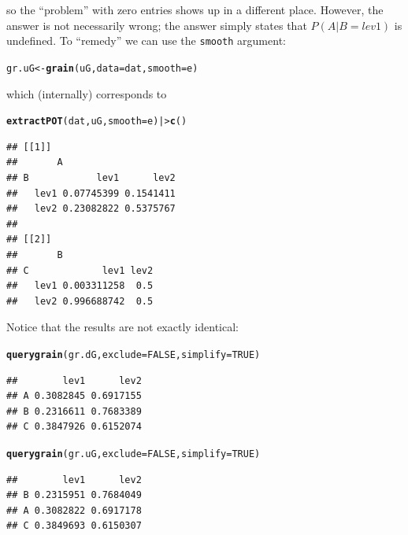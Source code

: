 \documentclass[10pt]{article}\usepackage[]{graphicx}\usepackage[]{xcolor}
\makeatletter
\newcommand{\hlnum}[1]{\textcolor[rgb]{0.686,0.059,0.569}{#1}}%
\newcommand{\hlstd}[1]{\textcolor[rgb]{0.345,0.345,0.345}{#1}}%
\newcommand{\hlkwb}[1]{\textcolor[rgb]{0.69,0.353,0.396}{#1}}%
\newcommand{\hlkwc}[1]{\textcolor[rgb]{0.333,0.667,0.333}{#1}}%
\newcommand{\hlkwd}[1]{\textcolor[rgb]{0.737,0.353,0.396}{\textbf{#1}}}%
\newenvironment{kframe}{%
 \def\at@end@of@kframe{}%
 \ifinner\ifhmode%
  \def\at@end@of@kframe{\end{minipage}}%
  \begin{minipage}{\columnwidth}%
 \fi\fi%
 \def\FrameCommand##1{\hskip\@totalleftmargin \hskip-\fboxsep
 \colorbox{shadecolor}{##1}\hskip-\fboxsep
     \hskip-\linewidth \hskip-\@totalleftmargin \hskip\columnwidth}%
 \MakeFramed {\advance\hsize-\width
   \@totalleftmargin\z@ \linewidth\hsize
   \@setminipage}}%
 {\par\unskip\endMakeFramed%
 \at@end@of@kframe}
\newenvironment{knitrout}{}{} %
\def\code#1{{\texttt{#1}}}
\makeatother
\begin{document}
so the ``problem'' with zero entries shows up in a different
place. However, the answer is not necessarily wrong; the answer simply
states that $P(A|B=lev1)$ is undefined.
To ``remedy'' we can use the \code{smooth} argument:
\begin{knitrout}
\color{fgcolor}\begin{kframe}
\begin{alltt}
\hlstd{gr.uG} \hlkwb{<-} \hlkwd{grain}\hlstd{(uG,} \hlkwc{data}\hlstd{=dat,} \hlkwc{smooth}\hlstd{=e)}
\end{alltt}
\end{kframe}
\end{knitrout}
which (internally) corresponds to
\begin{knitrout}
\color{fgcolor}\begin{kframe}
\begin{alltt}
\hlkwd{extractPOT}\hlstd{(dat, uG,} \hlkwc{smooth}\hlstd{=e) |>} \hlkwd{c}\hlstd{()}
\end{alltt}
\begin{verbatim}
## [[1]]
##       A
## B            lev1      lev2
##   lev1 0.07745399 0.1541411
##   lev2 0.23082822 0.5375767
## 
## [[2]]
##       B
## C             lev1 lev2
##   lev1 0.003311258  0.5
##   lev2 0.996688742  0.5
\end{verbatim}
\end{kframe}
\end{knitrout}

Notice that the results are not exactly identical:

\begin{knitrout}
\color{fgcolor}\begin{kframe}
\begin{alltt}
\hlkwd{querygrain}\hlstd{(gr.dG,} \hlkwc{exclude}\hlstd{=}\hlnum{FALSE}\hlstd{,} \hlkwc{simplify}\hlstd{=}\hlnum{TRUE}\hlstd{)}
\end{alltt}
\begin{verbatim}
##        lev1      lev2
## A 0.3082845 0.6917155
## B 0.2316611 0.7683389
## C 0.3847926 0.6152074
\end{verbatim}
\begin{alltt}
\hlkwd{querygrain}\hlstd{(gr.uG,} \hlkwc{exclude}\hlstd{=}\hlnum{FALSE}\hlstd{,} \hlkwc{simplify}\hlstd{=}\hlnum{TRUE}\hlstd{)}
\end{alltt}
\begin{verbatim}
##        lev1      lev2
## B 0.2315951 0.7684049
## A 0.3082822 0.6917178
## C 0.3849693 0.6150307
\end{verbatim}
\end{kframe}
\end{knitrout}
\end{document}
